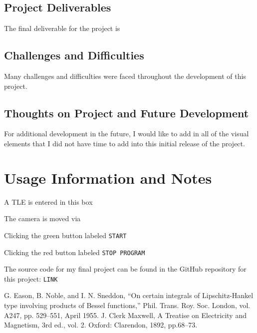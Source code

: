 \documentclass[conference]{IEEEtran}
\begin{document}
		\subsection{Project Deliverables}
			The final deliverable for the project is

		\subsection{Challenges and Difficulties}
			Many challenges and difficulties were faced throughout the development of this project.

		\subsection{Thoughts on Project and Future Development}
			For additional development in the future, I would like to add in all of the visual elements that I did not have time to add into this initial release of the project.

	\section*{Usage Information and Notes}
		A TLE is entered in this box

		The camera is moved via

		Clicking the green button labeled \texttt{START}

		Clicking the red button labeled \texttt{STOP PROGRAM}

		The source code for my final project can be found in the GitHub repository for this project: \texttt{LINK}

	\begin{thebibliography}{00}
		 G. Eason, B. Noble, and I. N. Sneddon, ``On certain integrals of Lipschitz-Hankel type involving products of Bessel functions,'' Phil. Trans. Roy. Soc. London, vol. A247, pp. 529--551, April 1955.
		 J. Clerk Maxwell, A Treatise on Electricity and Magnetism, 3rd ed., vol. 2. Oxford: Clarendon, 1892, pp.68--73.
	\end{thebibliography}
\end{document}
